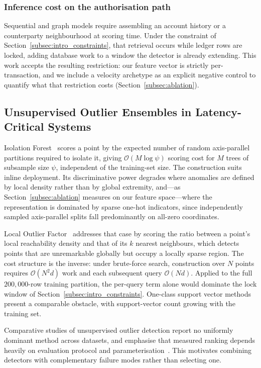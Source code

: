 \documentclass[conference]{IEEEtran}
\begin{document}
\subsubsection{Inference cost on the authorisation path}
Sequential and graph models require assembling an account history or a
counterparty neighbourhood at scoring time. Under the constraint of
Section~\ref{subsec:intro_constraints}, that retrieval occurs while
ledger rows are locked, adding database work to a window the detector
is already extending. This work accepts the resulting restriction: our
feature vector is strictly per-transaction, and we include a velocity
archetype as an explicit negative control to quantify what that
restriction costs (Section~\ref{subsec:ablation}).

\subsection{Unsupervised Outlier Ensembles in Latency-Critical Systems}
\label{subsec:rw_unsupervised}

Isolation Forest~\cite{liu2008} scores a point by the expected number
of random axis-parallel partitions required to isolate it, giving
$\mathcal{O}(M \log \psi)$ scoring cost for $M$ trees of subsample size
$\psi$, independent of the training-set size. The construction suits
inline deployment. Its discriminative power degrades where anomalies
are defined by local density rather than by global extremity, and---as
Section~\ref{subsec:ablation} measures on our feature space---where the
representation is dominated by sparse one-hot indicators, since
independently sampled axis-parallel splits fall predominantly on
all-zero coordinates.

Local Outlier Factor~\cite{breunig2000} addresses that case by scoring
the ratio between a point's local reachability density and that of its
$k$ nearest neighbours, which detects points that are unremarkable
globally but occupy a locally sparse region. The cost structure is the
inverse: under brute-force search, construction over $N$ points
requires $\mathcal{O}(N^{2}d)$ work and each subsequent query
$\mathcal{O}(Nd)$. Applied to the full $200{,}000$-row training
partition, the per-query term alone would dominate the lock window of
Section~\ref{subsec:intro_constraints}. One-class support vector
methods~\cite{scholkopf2001} present a comparable obstacle, with
support-vector count growing with the training set.

Comparative studies of unsupervised outlier detection report no
uniformly dominant method across datasets, and emphasise that measured
ranking depends heavily on evaluation protocol and
parameterisation~\cite{campos2016}. This motivates combining detectors
with complementary failure modes rather than selecting one.
\end{document}
